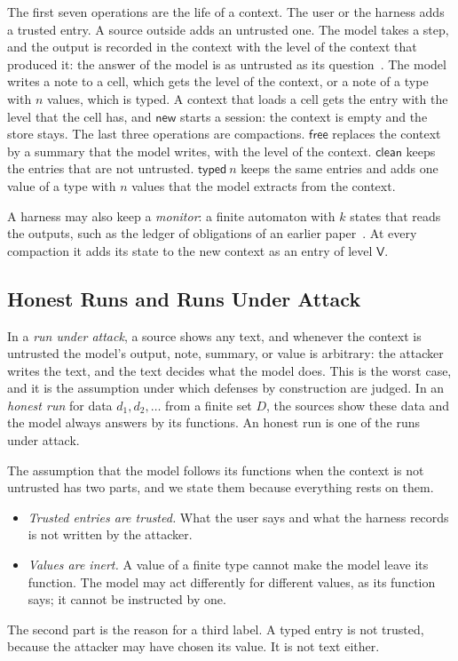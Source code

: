\documentclass[acmsmall,nonacm,screen]{acmart}
\newcommand{\kw}[1]{\mathsf{#1}}
\newcommand{\V}{\kw{V}}
\newcommand{\op}[1]{\kw{#1}}
\begin{document}
The first seven operations are the life of a context. The user or the harness adds a trusted
entry. A source outside adds an untrusted one. The model takes a step, and the output is
recorded in the context with the level of the context that produced it: the answer of the
model is as untrusted as its question~\cite{tpp7}. The model writes a note to a cell, which
gets the level of the context, or a note of a type with $n$ values, which is typed. A context
that loads a cell gets the entry with the level that the cell has, and $\op{new}$ starts a
session: the context is empty and the store stays. The last three operations are compactions. $\op{free}$ replaces the
context by a summary that the model writes, with the level of the context. $\op{clean}$
keeps the entries that are not untrusted. $\op{typed}\ n$ keeps the same entries and adds
one value of a type with $n$ values that the model extracts from the context.

A harness may also keep a \emph{monitor}: a finite automaton with $k$ states that reads the
outputs, such as the ledger of obligations of an earlier paper~\cite{tpp12}. At every
compaction it adds its state to the new context as an entry of level $\V$.

\subsection{Honest Runs and Runs Under Attack}

In a \emph{run under attack}, a source shows any text, and whenever the context is untrusted
the model's output, note, summary, or value is arbitrary: the attacker writes the text, and
the text decides what the model does. This is the worst case, and it is the assumption under
which defenses by construction are judged. In an \emph{honest run} for data $d_1, d_2,
\ldots$ from a finite set $D$, the sources show these data and the model always answers by
its functions. An honest run is one of the runs under attack.

The assumption that the model follows its functions when the context is not untrusted has
two parts, and we state them because everything rests on them.
\begin{itemize}
\item \emph{Trusted entries are trusted.} What the user says and what the harness records is
  not written by the attacker.
\item \emph{Values are inert.} A value of a finite type cannot make the model leave its
  function. The model may act differently for different values, as its function says; it
  cannot be instructed by one.
\end{itemize}
The second part is the reason for a third label. A typed entry is not trusted, because the
attacker may have chosen its value. It is not text either.
\end{document}
